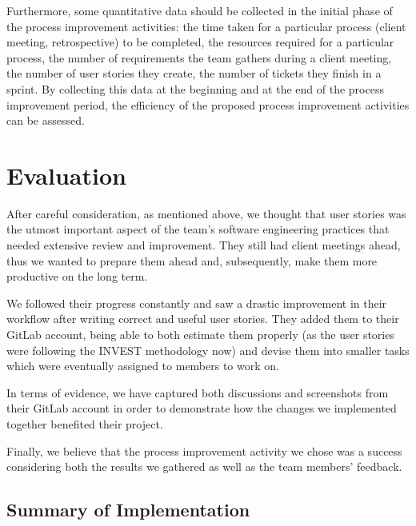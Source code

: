 \documentclass[11pt]{article}
\begin{document}
\par
Furthermore, some quantitative data should be collected in the initial phase of the process improvement activities: the time taken for a particular process (client meeting, retrospective) to be completed, the resources required for a particular process, the number of requirements the team gathers during a client meeting, the number of user stories they create, the number of tickets they finish in a sprint. By collecting this data at the beginning and at the end of the process improvement period, the efficiency of the proposed process improvement activities can be assessed. 

\par

\section*{Evaluation}

\par
After careful consideration, as mentioned above, we thought that user stories was the utmost important aspect of the team's software engineering practices that needed extensive review and improvement. They still had client meetings ahead, thus we wanted to prepare them ahead and, subsequently, make them more productive on the long term. 

\par
We followed their progress constantly and saw a drastic improvement in their workflow after writing correct and useful user stories. They added them to their GitLab account, being able to both estimate them properly (as the user stories were following the INVEST methodology now) and devise them into smaller tasks which were eventually assigned to members to work on.

\par
In terms of evidence, we have captured both discussions and screenshots from their GitLab account in order to demonstrate how the changes we implemented together benefited their project.

\par
Finally, we believe that the process improvement activity we chose was a success considering both the results we gathered as well as the team members' feedback. 

\subsection*{Summary of Implementation}
\end{document}

